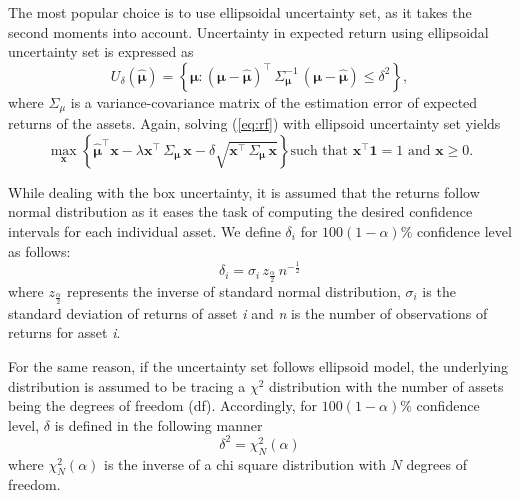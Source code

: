 The most popular choice is to use ellipsoidal uncertainty set, as it takes the second moments into account. Uncertainty in expected return using ellipsoidal uncertainty set is expressed as
\begin{equation}
U_{\delta}(\boldsymbol{\hat{\mu}}) = \left\{ \boldsymbol{\mu} : (\boldsymbol{\mu} - \boldsymbol{\hat{\mu}})^{\top} \, \Sigma^{-1}_{\boldsymbol{\mu}} \, (\boldsymbol{\mu} - \boldsymbol{\hat{\mu}}) \leq \delta^2 \right\},
\end{equation}
where $\Sigma_\mu$ is a variance-covariance matrix of the estimation error of expected returns of the assets.
Again, solving (\ref{eq:rf}) with ellipsoid uncertainty set yields
\begin{equation}
\max_{\mathbf{x}} \left\{ \boldsymbol{\hat{\mu}}^{\top} \mathbf{x} - \lambda \mathbf{x}^{\top} \, \Sigma_{\boldsymbol{\mu}} \, \mathbf{x} - \delta \sqrt{\mathbf{x}^{\top} \, \Sigma_{\boldsymbol{\mu}} \, \mathbf{x}} \right\} \text{such that } \mathbf{x^{\top}} \mathbf{1}  = 1 \text{ and } \mathbf{x} \geq 0.
\end{equation}

While dealing with the box uncertainty, it is assumed that the returns follow normal distribution as it eases the task of computing the desired confidence intervals for each individual asset. We define $\delta_{i}$ for $100(1-\alpha)\%$ confidence level as follows:
\begin{equation}
    \delta_{i}=\sigma_{i} \, z_\frac{\alpha}{2} \, n^{-\frac{1}{2}}
\end{equation}
where $z_{\frac{\alpha}{2}}$ represents the inverse of standard normal distribution, $\sigma_{i}$ is the standard deviation of returns of asset \textit{i} and \textit{n} is the number of observations of returns for asset \textit{i}.

For the same reason, if the uncertainty set follows ellipsoid model, the underlying distribution is assumed to be tracing a $\chi^2$ distribution with the number of assets being the degrees of freedom (df). Accordingly, for $100(1-\alpha)\%$ confidence level, $\delta$ is defined in the following manner
\begin{equation}
    \delta^2=\chi_{N}^2(\alpha)
\end{equation}
where $\chi_{N}^2(\alpha)$ is the inverse of a chi square distribution with $N$ degrees of freedom.
